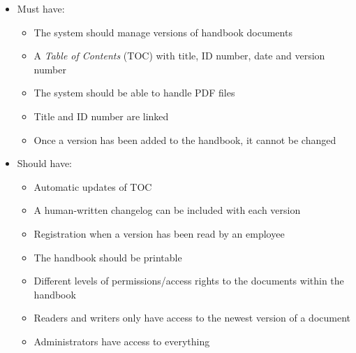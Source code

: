 \begin{itemize}
    \item
    Must have:
        \begin{itemize}
            \item
            The system should manage versions of handbook documents
            \item
            A \textit{Table of Contents} (TOC) with title, ID number, date and version number
            \item
            The system should be able to handle PDF files
            \item
            Title and ID number are linked
            \item
            Once a version has been added to the handbook, it cannot be changed
        \end{itemize}
    \item
    Should have:
        \begin{itemize}
			\item
			Automatic updates of TOC
            \item
            A human-written changelog can be included with each version
            \item
            Registration when a version has been read by an employee
            \item
            The handbook should be printable
            \item
            Different levels of permissions/access rights to the documents within the handbook
            \item
            Readers and writers only have access to the newest version of a document
            \item
            Administrators have access to everything

\end{itemize}
\end{itemize}
